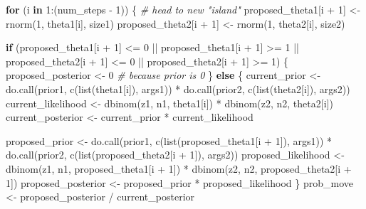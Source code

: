 \documentclass[
  12pt,
]{book}
\newenvironment{Shaded}{\begin{snugshade}}{\end{snugshade}}
\newcommand{\CommentTok}[1]{\textcolor[rgb]{0.56,0.35,0.01}{\textit{#1}}}
\newcommand{\ControlFlowTok}[1]{\textcolor[rgb]{0.13,0.29,0.53}{\textbf{#1}}}
\newcommand{\DecValTok}[1]{\textcolor[rgb]{0.00,0.00,0.81}{#1}}
\newcommand{\FunctionTok}[1]{\textcolor[rgb]{0.00,0.00,0.00}{#1}}
\newcommand{\NormalTok}[1]{#1}
\newcommand{\OtherTok}[1]{\textcolor[rgb]{0.56,0.35,0.01}{#1}}
\newcommand{\SpecialCharTok}[1]{\textcolor[rgb]{0.00,0.00,0.00}{#1}}
\theoremstyle{definition}
\theoremstyle{definition}
\theoremstyle{definition}
\theoremstyle{definition}
\theoremstyle{remark}
\begin{document}
\begin{Shaded}
\begin{Highlighting}[]
  \ControlFlowTok{for}\NormalTok{ (i }\ControlFlowTok{in} \DecValTok{1}\SpecialCharTok{:}\NormalTok{(num\_steps }\SpecialCharTok{{-}} \DecValTok{1}\NormalTok{)) \{}
    \CommentTok{\# head to new "island"}
\NormalTok{    proposed\_theta1[i }\SpecialCharTok{+} \DecValTok{1}\NormalTok{] }\OtherTok{\textless{}{-}} \FunctionTok{rnorm}\NormalTok{(}\DecValTok{1}\NormalTok{, theta1[i], size1)}
\NormalTok{    proposed\_theta2[i }\SpecialCharTok{+} \DecValTok{1}\NormalTok{] }\OtherTok{\textless{}{-}} \FunctionTok{rnorm}\NormalTok{(}\DecValTok{1}\NormalTok{, theta2[i], size2)}

    \ControlFlowTok{if}\NormalTok{ (proposed\_theta1[i }\SpecialCharTok{+} \DecValTok{1}\NormalTok{] }\SpecialCharTok{\textless{}=} \DecValTok{0} \SpecialCharTok{||}
\NormalTok{      proposed\_theta1[i }\SpecialCharTok{+} \DecValTok{1}\NormalTok{] }\SpecialCharTok{\textgreater{}=} \DecValTok{1} \SpecialCharTok{||}
\NormalTok{      proposed\_theta2[i }\SpecialCharTok{+} \DecValTok{1}\NormalTok{] }\SpecialCharTok{\textless{}=} \DecValTok{0} \SpecialCharTok{||}
\NormalTok{      proposed\_theta2[i }\SpecialCharTok{+} \DecValTok{1}\NormalTok{] }\SpecialCharTok{\textgreater{}=} \DecValTok{1}\NormalTok{) \{}
\NormalTok{      proposed\_posterior }\OtherTok{\textless{}{-}} \DecValTok{0} \CommentTok{\# because prior is 0}
\NormalTok{    \} }\ControlFlowTok{else}\NormalTok{ \{}
\NormalTok{      current\_prior }\OtherTok{\textless{}{-}}
        \FunctionTok{do.call}\NormalTok{(prior1, }\FunctionTok{c}\NormalTok{(}\FunctionTok{list}\NormalTok{(theta1[i]), args1)) }\SpecialCharTok{*}
          \FunctionTok{do.call}\NormalTok{(prior2, }\FunctionTok{c}\NormalTok{(}\FunctionTok{list}\NormalTok{(theta2[i]), args2))}
\NormalTok{      current\_likelihood }\OtherTok{\textless{}{-}}
        \FunctionTok{dbinom}\NormalTok{(z1, n1, theta1[i]) }\SpecialCharTok{*}
          \FunctionTok{dbinom}\NormalTok{(z2, n2, theta2[i])}
\NormalTok{      current\_posterior }\OtherTok{\textless{}{-}}\NormalTok{ current\_prior }\SpecialCharTok{*}\NormalTok{ current\_likelihood}

\NormalTok{      proposed\_prior }\OtherTok{\textless{}{-}}
        \FunctionTok{do.call}\NormalTok{(prior1, }\FunctionTok{c}\NormalTok{(}\FunctionTok{list}\NormalTok{(proposed\_theta1[i }\SpecialCharTok{+} \DecValTok{1}\NormalTok{]), args1)) }\SpecialCharTok{*}
          \FunctionTok{do.call}\NormalTok{(prior2, }\FunctionTok{c}\NormalTok{(}\FunctionTok{list}\NormalTok{(proposed\_theta2[i }\SpecialCharTok{+} \DecValTok{1}\NormalTok{]), args2))}
\NormalTok{      proposed\_likelihood }\OtherTok{\textless{}{-}}
        \FunctionTok{dbinom}\NormalTok{(z1, n1, proposed\_theta1[i }\SpecialCharTok{+} \DecValTok{1}\NormalTok{]) }\SpecialCharTok{*}
          \FunctionTok{dbinom}\NormalTok{(z2, n2, proposed\_theta2[i }\SpecialCharTok{+} \DecValTok{1}\NormalTok{])}
\NormalTok{      proposed\_posterior }\OtherTok{\textless{}{-}}\NormalTok{ proposed\_prior }\SpecialCharTok{*}\NormalTok{ proposed\_likelihood}
\NormalTok{    \}}
\NormalTok{    prob\_move }\OtherTok{\textless{}{-}}\NormalTok{ proposed\_posterior }\SpecialCharTok{/}\NormalTok{ current\_posterior}


\end{Highlighting}
\end{Shaded}
\end{document}
